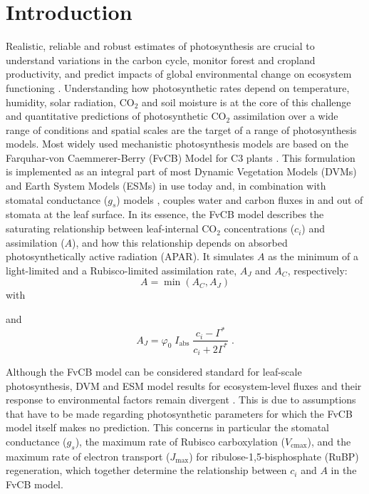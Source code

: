 \documentclass{myreport}
\newcommand{\vcmax}{$V_{\text{cmax}}$}
\newcommand{\jmax}{$J_{\text{max}}$}
\begin{document}
\section{Introduction}

Realistic, reliable and robust estimates of photosynthesis are crucial to understand variations in the carbon cycle, monitor forest and cropland productivity, and predict impacts of global environmental change on ecosystem functioning \citep{prentice15}. Understanding how photosynthetic rates depend on temperature, humidity, solar radiation, CO$_2$ and soil moisture is at the core of this challenge and quantitative predictions of photosynthetic CO$_2$ assimilation over a wide range of conditions and spatial scales are the target of a range of photosynthesis models. Most widely used mechanistic photosynthesis models are based on the Farquhar-von Caemmerer-Berry (FvCB) Model for C3 plants \citep{farquhar80, voncaemmerer81}. This formulation is implemented as an integral part of most Dynamic Vegetation Models (DVMs) and Earth System Models (ESMs) in use today \cite{smithdukes13gcb} and, in combination with stomatal conductance ($g_s$) models \citep{ball87, leuning95pce, medlyn11gcb}, couples water and carbon fluxes in and out of stomata at the leaf surface. In its essence, the FvCB model describes the saturating relationship between leaf-internal CO$_2$ concentrations ($c_i$) and assimilation ($A$), and how this relationship depends on absorbed photosynthetically active radiation (APAR). It simulates $A$ as the minimum of a light-limited and a Rubisco-limited assimilation rate, $A_J$ and $A_C$, respectively:
\begin{equation}
    A = \min(A_C, A_J)
\end{equation}
with 

and 
\begin{equation}
\label{eq:aj}
    A_J = \varphi_0 \; I_{\mathrm{abs}}\;\frac{c_i - \Gamma^{\ast}}{c_i + 2\Gamma^{\ast}} \;.
\end{equation}

Although the FvCB model can be considered standard for leaf-scale photosynthesis, DVM and ESM model results for ecosystem-level fluxes and their response to environmental factors remain divergent \citep{rogers17}. This is due to assumptions that have to be made regarding photosynthetic parameters for which the FvCB model itself makes no prediction. This concerns in particular the stomatal conductance ($g_s$), the maximum rate of Rubisco carboxylation (\vcmax ), and the maximum rate of electron transport (\jmax ) for ribulose-1,5-bisphosphate (RuBP) regeneration, which together determine the relationship between $c_i$ and $A$ in the FvCB model. 
\end{document}

